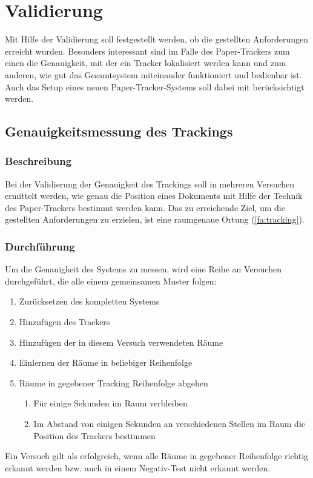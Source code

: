 \chapter{Validierung}
Mit Hilfe der Validierung soll festgestellt werden, ob die gestellten Anforderungen erreicht wurden.
Besonders interessant sind im Falle des Paper-Trackers zum einen die Genauigkeit, mit der ein Tracker lokalisiert werden
kann und zum anderen, wie gut das Gesamtsystem miteinander funktioniert und bedienbar ist.
Auch das Setup eines neuen Paper-Tracker-Systems soll dabei mit berücksichtigt werden.

\section{Genauigkeitsmessung des Trackings} \label{sec:validation-tracking}

\subsection{Beschreibung}
Bei der Validierung der Genauigkeit des Trackings soll in mehreren Versuchen ermittelt werden, wie genau die Position
eines Dokuments mit Hilfe der Technik des Paper-Trackers bestimmt werden kann.
Das zu erreichende Ziel, um die gestellten Anforderungen zu erzielen, ist eine raumgenaue Ortung (\ref*{fa:tracking}).

\subsection{Durchführung}
Um die Genauigkeit des Systems zu messen, wird eine Reihe an Versuchen durchgeführt, die alle einem gemeinsamen Muster folgen:
\begin{enumerate}
	\item Zurücksetzen des kompletten Systems
	\item Hinzufügen des Trackers
	\item Hinzufügen der in diesem Versuch verwendeten Räume
	\item Einlernen der Räume in beliebiger Reihenfolge
	\item Räume in gegebener Tracking Reihenfolge abgehen
	\begin{enumerate}
		\item Für einige Sekunden im Raum verbleiben
		\item Im Abstand von einigen Sekunden an verschiedenen Stellen im Raum die Position des Trackers bestimmen
	\end{enumerate}
\end{enumerate}
Ein Versuch gilt als erfolgreich, wenn alle Räume in gegebener Reihenfolge richtig erkannt werden bzw. auch in einem
Negativ-Test nicht erkannt werden.

